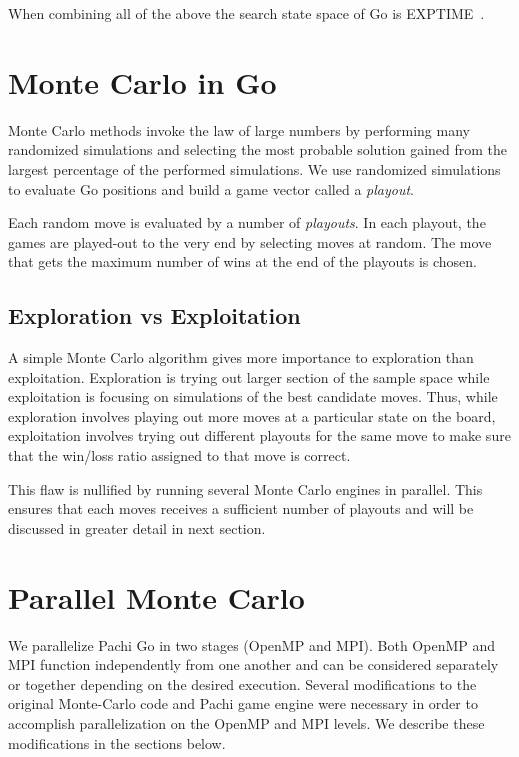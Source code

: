\documentclass[nocopyrightspace, 10pt]{sigplanconf}
\begin{document}
When combining all of the above the search state space of Go is EXPTIME~\cite{exptime,exptime2}.

\section{Monte Carlo in Go}
Monte Carlo methods invoke the law of large numbers by performing many randomized simulations and selecting the most probable solution gained from the largest percentage of the performed simulations. We use randomized simulations to evaluate Go positions and build a game vector called a \textit{playout}. 

Each random move is evaluated by a number of \textit{playouts}. In each playout, the games are played-out to the very end by selecting moves at random. The move that gets the maximum number of wins at the end of the playouts is chosen.

\subsection{Exploration vs Exploitation}

A simple Monte Carlo algorithm gives more importance to exploration than exploitation. Exploration is trying out larger section of the sample space while exploitation is focusing on simulations of the best candidate moves. Thus, while exploration involves playing out more moves at a particular state on the board, exploitation involves trying out different playouts for the same move to make sure that the win/loss ratio assigned to that move is correct. 

This flaw is nullified by running several Monte Carlo engines in parallel. This ensures that each moves receives a sufficient number of playouts and will be discussed in greater detail in next section.

\section{Parallel Monte Carlo}

We parallelize Pachi Go in two stages (OpenMP and MPI).  Both OpenMP and MPI function independently from one another and can be considered separately or together depending on the desired execution.  Several modifications to the original Monte-Carlo code and Pachi game engine were necessary in order to accomplish parallelization on the OpenMP and MPI levels.  We describe these modifications in the sections below.
\end{document}
